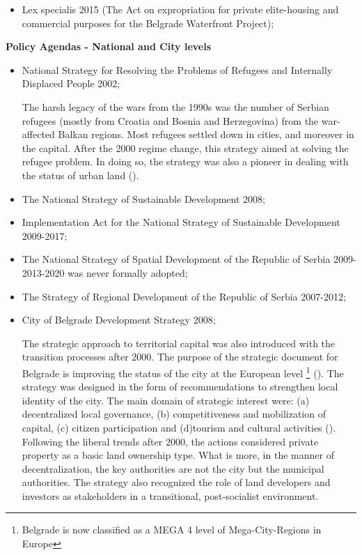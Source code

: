 \documentclass[11pt]{report}
\begin{document}
{{{{\begin{itemize}
\item Lex specialis 2015 (The Act on expropriation for private elite-housing and commercial purposes for the Belgrade Waterfront Project);
\end{itemize}

\textbf{Policy Agendas - National and City levels}

\begin{itemize}
\item National Strategy for Resolving the Problems of Refugees and Internally Displaced People 2002;

The harsh legacy of the wars from the 1990s was the number of Serbian refugees (mostly from Croatia and Bosnia and Herzegovina) from the war-affected Balkan regions. Most refugees settled down in cities, and moreover in the capital. After the 2000 regime change, this strategy aimed at solving the refugee problem. In doing so, the strategy was also a pioneer in dealing with the status of urban land (\href{Hirt}{\citealt{hirt_belgrade_2009}}).

\item The National Strategy of Sustainable Development 2008;

\item Implementation Act for the National Strategy of Sustainable Development 2009-2017;

\item The National Strategy of Spatial Development of the Republic of Serbia 2009-2013-2020 was never formally adopted;

\item The Strategy of Regional Development of the Republic of Serbia 2007-2012;

\item City of Belgrade Development Strategy 2008;

The strategic approach to territorial capital was also introduced with the transition processes after 2000.
The purpose of the strategic document for Belgrade is improving the status of the city at the European level
\footnote{Belgrade is now classified as a MEGA 4 level of Mega-City-Regions in Europe}
(\href{Nedovic}{\citealt{nedovic-budic_adjustment_2001}}).
The strategy was designed in the form of recommendations to strengthen local identity of the city. The main domain of strategic interest were: (a) decentralized local governance, (b) competitiveness and mobilization of capital, (c) citizen participation and (d)tourism and cultural activities  (\href{Vukmirovic}{\citealt{doytchinov_belgrade:_2015}}).
Following the liberal trends after 2000, the actions considered private property as a basic land ownership type. What is more, in the manner of decentralization, the key authorities are not the city but the municipal authorities. The strategy also recognized the role of land developers and investors as stakeholders in a transitional, post-socialist environment.
\end{itemize}

}}}}
\end{document}
